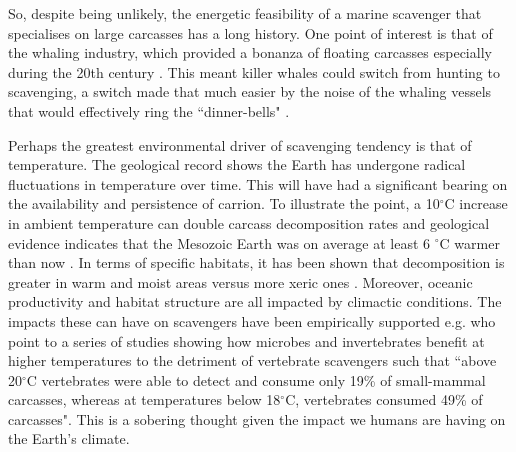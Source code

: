 \documentclass[a4paper,12pt]{article}
\begin{document}
So, despite being unlikely, the energetic feasibility of a marine scavenger that specialises on large carcasses has a long history.
One point of interest is that of the whaling industry, which provided a bonanza of floating carcasses especially during the 20th century \citep{Whitehead415}.
This meant killer whales could switch from hunting to scavenging, a switch made that much easier by the noise of the whaling vessels that would effectively ring the ``dinner-bells" \citep{Whitehead415}.

Perhaps the greatest environmental driver of scavenging tendency is that of temperature. 
The geological record shows the Earth has undergone radical fluctuations in temperature over time.
This will have had a significant bearing on the availability and persistence of carrion.
To illustrate the point, a 10$^{\circ}$C increase in ambient temperature can double carcass decomposition rates \citep{parmenter2009carrion} and geological evidence indicates that the Mesozoic Earth was on average at least 6 $^{\circ}$C warmer than now \citep{sellwood2006mesozoic}.
In terms of specific habitats, it has been shown that decomposition is greater in warm and moist areas versus more xeric ones \citep{beasley2015vertebrates}.
Moreover, oceanic productivity and habitat structure are all impacted by climactic conditions.
The impacts these can have on scavengers have been empirically supported e.g. \cite{beasley2015vertebrates} who point to a series of studies showing how microbes and invertebrates benefit at higher temperatures to the detriment of vertebrate scavengers such that ``above 20$^{\circ}$C vertebrates were able to detect and consume only 19\% of small-mammal carcasses, whereas at temperatures below 18$^{\circ}$C, vertebrates consumed 49\% of carcasses".
This is a sobering thought given the impact we humans are having on the Earth's climate. 


\end{document}
